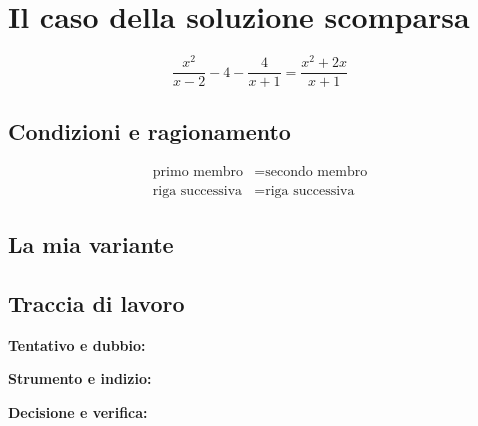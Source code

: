 \documentclass[11pt,a4paper]{article}
\begin{document}
\section*{Il caso della soluzione scomparsa}
\[
\frac{x^2}{x-2}-4-\frac{4}{x+1}=\frac{x^2+2x}{x+1}
\]

\subsection*{Condizioni e ragionamento}
\begin{align*}
\text{primo membro} &= \text{secondo membro}\\
\text{riga successiva} &= \text{riga successiva}
\end{align*}

\subsection*{La mia variante}

\subsection*{Traccia di lavoro}
\textbf{Tentativo e dubbio:} \par
\textbf{Strumento e indizio:} \par
\textbf{Decisione e verifica:} \par
\end{document}
